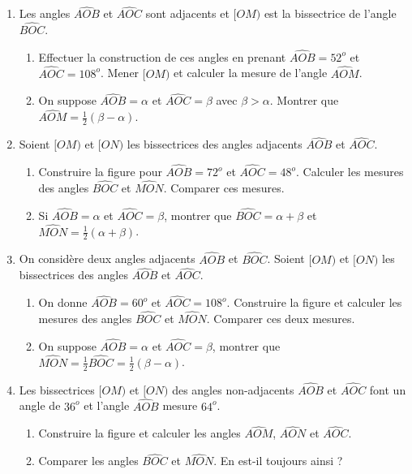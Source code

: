 \begin{enumerate}
\item Les angles $\widehat{AOB}$ et $\widehat{AOC}$ sont adjacents et 
$[OM)$ est la bissectrice de l'angle $\widehat{BOC}$. 
\begin{enumerate}
\item Effectuer la construction de ces angles en prenant $\widehat{AOB}= 52^o$ et $\widehat{AOC}=108^o$. Mener $[OM)$ et calculer la mesure 
de l'angle $\widehat{AOM}$. 
\item On suppose $\widehat{AOB}= \alpha$ et $\widehat{AOC}= \beta$ avec $\beta>\alpha$. Montrer que $\widehat{AOM}= \frac12(\beta-\alpha)$. 
\end{enumerate}

\item Soient $[OM)$ et $[ON)$ les bissectrices des angles adjacents $\widehat{AOB}$ et $\widehat{AOC}$. 
\begin{enumerate}
\item Construire la figure pour $\widehat{AOB}= 72^o$ et $\widehat{AOC}= 48^o$. Calculer les mesures des angles $\widehat{BOC}$ et $\widehat{MON}$. Comparer ces mesures. 
\item Si $\widehat{AOB}= \alpha$ et $\widehat{AOC}= \beta$, montrer 
que $\widehat{BOC}= \alpha + \beta$ et $\widehat{MON}= \frac12(\alpha+\beta)$. 
\end{enumerate}

\item On considère deux angles adjacents $\widehat{AOB}$ et $\widehat{BOC}$. Soient $[OM)$ et $[ON)$ les bissectrices des angles $\widehat{AOB}$ et $\widehat{AOC}$.
\begin{enumerate}
\item On donne $\widehat{AOB}= 60^o$ et $\widehat{AOC}= 108^o$. Construire la figure et calculer les mesures des angles $\widehat{BOC}$ et $\widehat{MON}$. Comparer ces deux mesures. 
\item On suppose $\widehat{AOB}= \alpha$ et $\widehat{AOC}= \beta$, montrer que $\widehat{MON}= \frac12\widehat{BOC}= \frac12(\beta-\alpha)$. 
\end{enumerate}

\item Les bissectrices $[OM)$ et $[ON)$ des angles non-adjacents $\widehat{AOB}$ et $\widehat{AOC}$ font un angle de $36^o$ et l'angle $\widehat{AOB}$ mesure $64^o$. \begin{enumerate}
\item Construire la figure et calculer les angles $\widehat{AOM}$, $\widehat{AON}$ et $\widehat{AOC}$.
\item Comparer les angles $\widehat{BOC}$ et $\widehat{MON}$. En est-il toujours ainsi ? 
\end{enumerate}


\end{enumerate}
